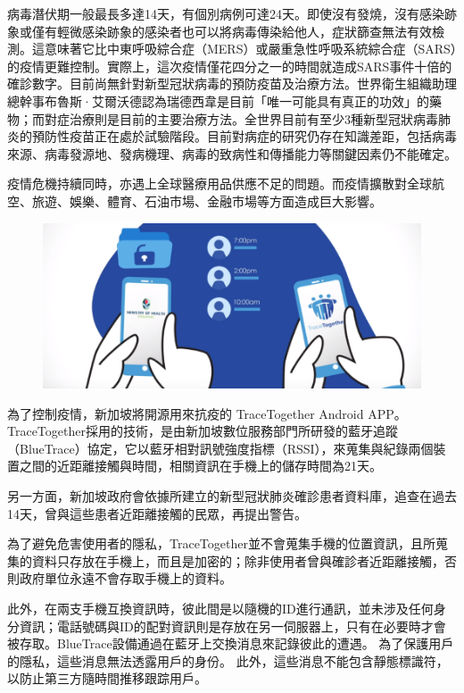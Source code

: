 \documentclass[12pt, a4paper]{report}
\begin{document}
病毒潛伏期一般最長多達14天，有個別病例可達24天。即使沒有發燒，沒有感染跡象或僅有輕微感染跡象的感染者也可以將病毒傳染給他人，症狀篩查無法有效檢測。這意味著它比中東呼吸綜合症（MERS）或嚴重急性呼吸系統綜合症（SARS）的疫情更難控制。實際上，這次疫情僅花四分之一的時間就造成SARS事件十倍的確診數字。目前尚無針對新型冠狀病毒的預防疫苗及治療方法。世界衛生組織助理總幹事布魯斯·艾爾沃德認為瑞德西韋是目前「唯一可能具有真正的功效」的藥物；而對症治療則是目前的主要治療方法。全世界目前有至少3種新型冠狀病毒肺炎的預防性疫苗正在處於試驗階段。目前對病症的研究仍存在知識差距，包括病毒來源、病毒發源地、發病機理、病毒的致病性和傳播能力等關鍵因素仍不能確定。

疫情危機持續同時，亦遇上全球醫療用品供應不足的問題。而疫情擴散對全球航空、旅遊、娛樂、體育、石油市場、金融市場等方面造成巨大影響。 

\begin{figure}[H] %
    \centering %
    \includegraphics[width=1\textwidth]{tracetogether.png} %
\end{figure}

為了控制疫情，新加坡將開源用來抗疫的 TraceTogether Android APP。TraceTogether採用的技術，是由新加坡數位服務部門所研發的藍牙追蹤（BlueTrace）協定，它以藍牙相對訊號強度指標（RSSI），來蒐集與紀錄兩個裝置之間的近距離接觸與時間，相關資訊在手機上的儲存時間為21天。

另一方面，新加坡政府會依據所建立的新型冠狀肺炎確診患者資料庫，追查在過去14天，曾與這些患者近距離接觸的民眾，再提出警告。

為了避免危害使用者的隱私，TraceTogether並不會蒐集手機的位置資訊，且所蒐集的資料只存放在手機上，而且是加密的；除非使用者曾與確診者近距離接觸，否則政府單位永遠不會存取手機上的資料。

此外，在兩支手機互換資訊時，彼此間是以隨機的ID進行通訊，並未涉及任何身分資訊；電話號碼與ID的配對資訊則是存放在另一伺服器上，只有在必要時才會被存取。BlueTrace設備通過在藍牙上交換消息來記錄彼此的遭遇。 為了保護用戶的隱私，這些消息無法透露用戶的身份。 此外，這些消息不能包含靜態標識符，以防止第三方隨時間推移跟踪用戶。
\end{document}
